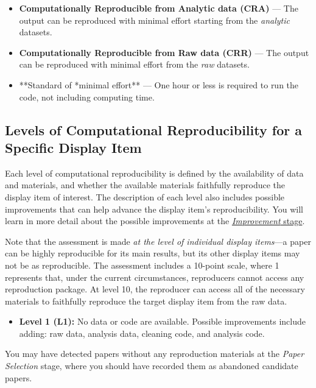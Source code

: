 \documentclass[
  openany]{book}
\providecommand{\tightlist}{%
  \setlength{\itemsep}{0pt}\setlength{\parskip}{0pt}}
\begin{document}
\begin{itemize}
\item
  \textbf{Computationally Reproducible from Analytic data (CRA)} --- The output can be reproduced with minimal effort starting from the \emph{analytic} datasets.
\item
  \textbf{Computationally Reproducible from Raw data (CRR)} --- The output can be reproduced with minimal effort from the \emph{raw} datasets.
\item
  **Standard of *minimal effort** --- One hour or less is required to run the code, not including computing time.
\end{itemize}

\hypertarget{levels-of-computational-reproducibility-for-a-specific-display-item}{%
\subsection{Levels of Computational Reproducibility for a Specific Display Item}\label{levels-of-computational-reproducibility-for-a-specific-display-item}}

Each level of computational reproducibility is defined by the availability of data and materials, and whether the available materials faithfully reproduce the display item of interest. The description of each level also includes possible improvements that can help advance the display item's reproducibility. You will learn in more detail about the possible improvements at the \protect\hyperlink{improvements}{\emph{Improvement} stage}.

Note that the assessment is made \emph{at the level of individual display items}---a paper can be highly reproducible for its main results, but its other display items may not be as reproducible. The assessment includes a 10-point scale, where 1 represents that, under the current circumstances, reproducers cannot access any reproduction package. At level 10, the reproducer can access all of the necessary materials to faithfully reproduce the target display item from the raw data.

\begin{itemize}
\tightlist
\item
  \textbf{Level 1 (L1):} No data or code are available. Possible improvements include adding: raw data, analysis data, cleaning code, and analysis code.
\end{itemize}

You may have detected papers without any reproduction materials at the \emph{Paper Selection} stage, where you should have recorded them as abandoned candidate papers.
\end{document}
